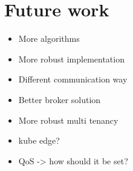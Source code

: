 \chapter{Future work}
\begin{itemize}
    \item More algorithms
    \item More robust implementation
    \item Different communication way
    \item Better broker solution
    \item More robust multi tenancy
    \item kube edge?
    \item QoS -> how should it be set?
\end{itemize}

